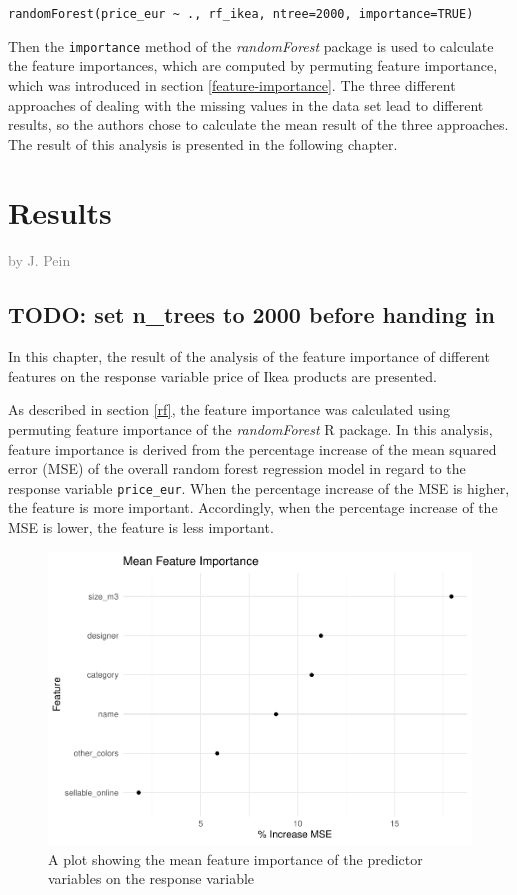 \documentclass[a4paper, nobind]{templates/ociamthesis}
\begin{document}
\texttt{randomForest(price\_eur\ \textasciitilde{}\ .,\ rf\_ikea,\ ntree=2000,\ importance=TRUE)}

Then the \texttt{importance} method of the \emph{randomForest} package is used to calculate the feature importances, which are computed by permuting feature importance, which was introduced in section \ref{feature-importance}. The three different approaches of dealing with the missing values in the data set lead to different results, so the authors chose to calculate the mean result of the three approaches. The result of this analysis is presented in the following chapter.

\hypertarget{results}{%
\chapter{Results}\label{results}}

\hfill\textcolor{gray}{by J. Pein}

\hypertarget{todo-set-n_trees-to-2000-before-handing-in}{%
\section{TODO: set n\_trees to 2000 before handing in}\label{todo-set-n_trees-to-2000-before-handing-in}}

In this chapter, the result of the analysis of the feature importance of different features on the response variable price of Ikea products are presented.

As described in section \ref{rf}, the feature importance was calculated using permuting feature importance of the \emph{randomForest} R package. In this analysis, feature importance is derived from the percentage increase of the mean squared error (MSE) of the overall random forest regression model in regard to the response variable \texttt{price\_eur}. When the percentage increase of the MSE is higher, the feature is more important. Accordingly, when the percentage increase of the MSE is lower, the feature is less important.

\begin{figure}
\includegraphics[width=1\linewidth]{_main_files/figure-latex/mean-feature-importance-1} \caption{A plot showing the mean feature importance of the predictor variables on the response variable}\label{fig:mean-feature-importance}
\end{figure}
\end{document}
